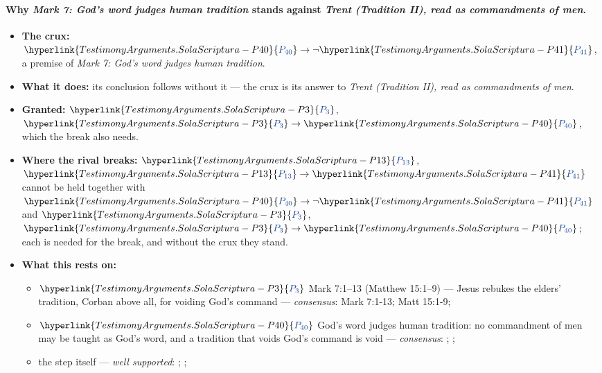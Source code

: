 \documentclass[11pt]{article}
\newcommand{\pvar}[2]{\hyperlink{#1-P#2}{\textcolor{claimlink}{P_{#2}}}}
\begin{document}
\paragraph{Why \emph{Mark 7: God’s word judges human tradition} stands against \emph{Trent (Tradition II), read as commandments of men}.}
\begin{itemize}
\item \textbf{The crux:} \(\pvar{TestimonyArguments.SolaScriptura}{40} \rightarrow \lnot \pvar{TestimonyArguments.SolaScriptura}{41}\), a premise of \emph{Mark 7: God’s word judges human tradition}.
\item \textbf{What it does:} its conclusion follows without it --- the crux is its answer to \emph{Trent (Tradition II), read as commandments of men}.
\item \textbf{Granted:} \(\pvar{TestimonyArguments.SolaScriptura}{3}\), \(\pvar{TestimonyArguments.SolaScriptura}{3} \rightarrow \pvar{TestimonyArguments.SolaScriptura}{40}\), which the break also needs.
\item \textbf{Where the rival breaks:} \(\pvar{TestimonyArguments.SolaScriptura}{13}\), \(\pvar{TestimonyArguments.SolaScriptura}{13} \rightarrow \pvar{TestimonyArguments.SolaScriptura}{41}\) cannot be held together with \(\pvar{TestimonyArguments.SolaScriptura}{40} \rightarrow \lnot \pvar{TestimonyArguments.SolaScriptura}{41}\) and \(\pvar{TestimonyArguments.SolaScriptura}{3}\), \(\pvar{TestimonyArguments.SolaScriptura}{3} \rightarrow \pvar{TestimonyArguments.SolaScriptura}{40}\); each is needed for the break, and without the crux they stand.
\item \textbf{What this rests on:}
\begin{itemize}
\item \(\pvar{TestimonyArguments.SolaScriptura}{3}\) Mark 7:1–13 (Matthew 15:1–9) — Jesus rebukes the elders’ tradition, Corban above all, for voiding God’s command --- \emph{consensus}: Mark 7:1-13; Matt 15:1-9; \cite[IV.x.10]{calvin-institutes-1960}
\item \(\pvar{TestimonyArguments.SolaScriptura}{40}\) God’s word judges human tradition: no commandment of men may be taught as God’s word, and a tradition that voids God’s command is void --- \emph{consensus}: \cite[Vatican II (1965), Dei Verbum 10]{tanner-decrees-1990}; \cite[IV.x.23]{calvin-institutes-1960}; \cite{florovsky-bible-church-tradition-1972}
\item the step itself --- \emph{well supported}: \cite[Vatican II (1965), Dei Verbum 10]{tanner-decrees-1990}; \cite[IV.x.23]{calvin-institutes-1960}; \cite[15--16]{wenham-our-lords-view-1953}
\end{itemize}
\end{itemize}
\end{document}
